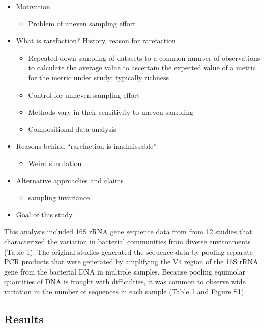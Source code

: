 \documentclass[
]{article}
\providecommand{\tightlist}{%
  \setlength{\itemsep}{0pt}\setlength{\parskip}{0pt}}
\begin{document}
\begin{itemize}
\tightlist
\item
  Motivation

  \begin{itemize}
  \tightlist
  \item
    Problem of uneven sampling effort
  \end{itemize}
\item
  What is rarefaction? History, reason for rarefaction

  \begin{itemize}
  \tightlist
  \item
    Repeated down sampling of datasets to a common number of
    observations to calculate the average value to ascertain the
    expected value of a metric for the metric under study; typically
    richness
  \item
    Control for unneven sampling effort
  \item
    Methods vary in their sensitivity to uneven sampling
  \item
    Compositional data analysis
  \end{itemize}
\item
  Reasons behind ``rarefaction is inadmissable''

  \begin{itemize}
  \tightlist
  \item
    Weird simulation
  \end{itemize}
\item
  Alternative approaches and claims

  \begin{itemize}
  \tightlist
  \item
    sampling invariance
  \end{itemize}
\item
  Goal of this study
\end{itemize}

This analysis included 16S rRNA gene sequence data from from 12 studies
that characterized the variation in bacterial communities from diverse
environments (Table 1). The original studies generated the sequence data
by pooling separate PCR products that were generated by amplifying the
V4 region of the 16S rRNA gene from the bacterial DNA in multiple
samples. Because pooling equimolar quantities of DNA is frought with
difficulties, it was common to observe wide variation in the number of
sequences in each sample (Table 1 and Figure S1).

\hypertarget{results}{%
\subsection{Results}\label{results}}
\end{document}
